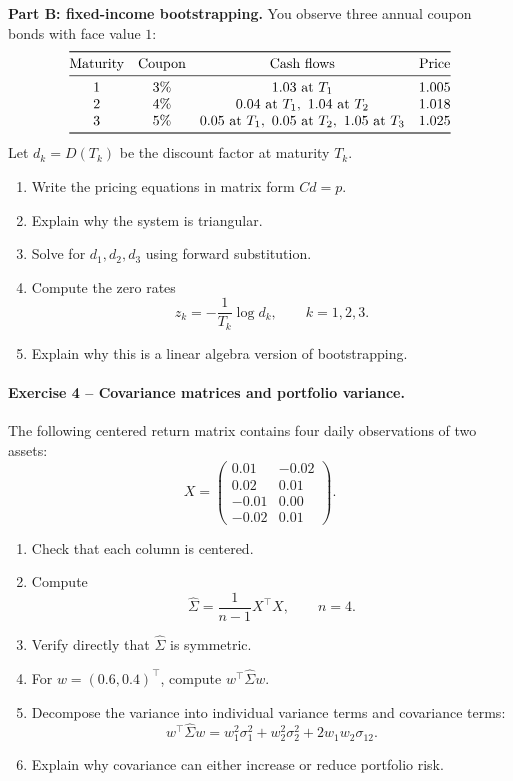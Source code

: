 \documentclass[10pt]{article}
\begin{document}
\textbf{Part B: fixed-income bootstrapping.}
You observe three annual coupon bonds with face value $1$:
\[
\begin{array}{@{}cccc@{}}
\toprule
\text{Maturity} & \text{Coupon} & \text{Cash flows} & \text{Price}\\
\midrule
1 & 3\% & 1.03\text{ at }T_1 & 1.005\\
2 & 4\% & 0.04\text{ at }T_1,\ 1.04\text{ at }T_2 & 1.018\\
3 & 5\% & 0.05\text{ at }T_1,\ 0.05\text{ at }T_2,\ 1.05\text{ at }T_3 & 1.025\\
\bottomrule
\end{array}
\]
Let $d_k=D(T_k)$ be the discount factor at maturity $T_k$.
\begin{enumerate}
\item Write the pricing equations in matrix form $Cd=p$.
\item Explain why the system is triangular.
\item Solve for $d_1,d_2,d_3$ using forward substitution.
\item Compute the zero rates
\[
z_k=-\frac{1}{T_k}\log d_k,\qquad k=1,2,3.
\]
\item Explain why this is a linear algebra version of bootstrapping.
\end{enumerate}

\paragraph{Exercise 4 -- Covariance matrices and portfolio variance.}
The following centered return matrix contains four daily observations of two
assets:
\[
X=
\begin{pmatrix}
0.01&-0.02\\
0.02&0.01\\
-0.01&0.00\\
-0.02&0.01
\end{pmatrix}.
\]

\begin{enumerate}
\item Check that each column is centered.
\item Compute
\[
\widehat{\Sigma}=\frac{1}{n-1}X^\top X,\qquad n=4.
\]
\item Verify directly that $\widehat{\Sigma}$ is symmetric.
\item For $w=(0.6,0.4)^\top$, compute $w^\top\widehat{\Sigma}w$.
\item Decompose the variance into individual variance terms and covariance
terms:
\[
w^\top\widehat{\Sigma}w
=w_1^2\sigma_1^2+w_2^2\sigma_2^2+2w_1w_2\sigma_{12}.
\]
\item Explain why covariance can either increase or reduce portfolio risk.
\end{enumerate}
\end{document}
